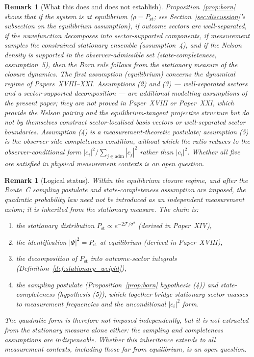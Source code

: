 \documentclass[12pt]{article}
\newtheorem{remark}[theorem]{Remark}
\newcommand{\Fcal}{\mathcal{F}}
\newcommand{\Pst}{P_{\mathrm{st}}}
\begin{document}
\begin{remark}[What this does and does not establish]
Proposition~\ref{prop:born} shows that \textit{if} the system is at equilibrium ($\rho = \Pst$; see Section~\ref{sec:discussion}'s subsection on the equilibrium assumption), \textit{if} outcome sectors are well-separated, \textit{if} the wavefunction decomposes into sector-supported components, \textit{if} measurement samples the constrained stationary ensemble (assumption~4), \emph{and} \textit{if} the Nelson density is supported in the observer-admissible set (state-completeness, assumption~5), then the Born rule follows from the stationary measure of the closure dynamics. The first assumption (equilibrium) concerns the dynamical regime of Papers~XVIII--XXI. Assumptions (2) and (3) --- well-separated sectors and a sector-supported decomposition --- are additional modelling assumptions of the present paper; they are \emph{not} proved in Paper~XVIII or Paper~XXI, which provide the Nelson pairing and the equilibrium-tangent projective structure but do not by themselves construct sector-localised basis vectors or well-separated sector boundaries. Assumption (4) is a measurement-theoretic postulate; assumption (5) is the observer-side completeness condition, without which the ratio reduces to the observer-conditional form $|c_i|^2 / \sum_{j\in\mathrm{adm}}|c_j|^2$ rather than $|c_i|^2$. Whether all five are satisfied in physical measurement contexts is an open question.
\end{remark}

\begin{remark}[Logical status]
Within the equilibrium closure regime, and after the Route~C sampling postulate and state-completeness assumption are imposed, the quadratic probability law need not be introduced as an independent measurement axiom; it is inherited from the stationary measure. The chain is:
\begin{enumerate}
    \item the stationary distribution $\Pst \propto e^{-2\Fcal/\sigma^2}$ (derived in Paper~XIV),
    \item the identification $|\Psi|^2 = \Pst$ at equilibrium (derived in Paper~XVIII),
    \item the decomposition of $\Pst$ into outcome-sector integrals (Definition~\ref{def:stationary_weight}),
    \item the sampling postulate (Proposition~\ref{prop:born} hypothesis (4)) and state-completeness (hypothesis (5)), which together bridge stationary sector masses to measurement frequencies and the unconditional $|c_i|^2$ form.
\end{enumerate}
The quadratic form is therefore not imposed independently, but it is not extracted from the stationary measure alone either: the sampling and completeness assumptions are indispensable. Whether this inheritance extends to all measurement contexts, including those far from equilibrium, is an open question.
\end{remark}
\end{document}

